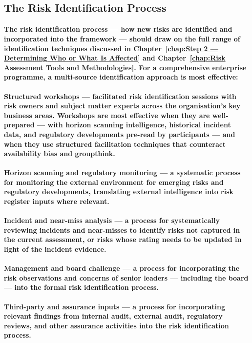 \subsection{The Risk Identification Process}
\paragraph{The risk identification process — how new risks are identified and incorporated into the framework — should draw on the full range of identification techniques discussed in Chapter~\ref{chap:Step 2 — Determining Who or What Is Affected} and Chapter~\ref{chap:Risk Assessment Tools and Methodologies}. For a comprehensive enterprise programme, a multi-source identification approach is most effective:}
\paragraph{\textbf{Structured workshops} — facilitated risk identification sessions with risk owners and subject matter experts across the organisation's key business areas. Workshops are most effective when they are well-prepared — with horizon scanning intelligence, historical incident data, and regulatory developments pre-read by participants — and when they use structured facilitation techniques that counteract availability bias and groupthink.}
\paragraph{\textbf{Horizon scanning and regulatory monitoring} — a systematic process for monitoring the external environment for emerging risks and regulatory developments, translating external intelligence into risk register inputs where relevant.}
\paragraph{\textbf{Incident and near-miss analysis} — a process for systematically reviewing incidents and near-misses to identify risks not captured in the current assessment, or risks whose rating needs to be updated in light of the incident evidence.}
\paragraph{\textbf{Management and board challenge} — a process for incorporating the risk observations and concerns of senior leaders — including the board — into the formal risk identification process.}
\paragraph{\textbf{Third-party and assurance inputs} — a process for incorporating relevant findings from internal audit, external audit, regulatory reviews, and other assurance activities into the risk identification process.}

